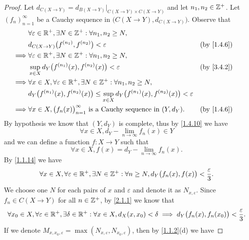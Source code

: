 \begin{proof}
  Let \(d_{C(X \to Y)} = d_{B(X \to Y)}|_{C(X \to Y) \times C(X \to Y)}\) and let \(n_1, n_2 \in \mathbb{Z}^+\).
  Let \((f_n)_{n = 1}^\infty\) be a Cauchy sequence in \(\big(C(X \to Y), d_{C(X \to Y)}\big)\).
  Observe that
  \begin{align*}
             & \forall \varepsilon \in \R^+, \exists N \in \Z^+ : \forall n_1, n_2 \geq N,                                                       \\
             & d_{C(X \to Y)}\big(f^{(n_1)}, f^{(n_2)}\big) < \varepsilon                                                        &  & \by{1.4.6} \\
    \implies & \forall \varepsilon \in \R^+, \exists N \in \Z^+ : \forall n_1, n_2 \geq N,                                                       \\
             & \sup_{x \in X} d_Y\big(f^{(n_1)}(x), f^{(n_2)}(x)\big) < \varepsilon                                              &  & \by{3.4.2} \\
    \implies & \forall x \in X, \forall \varepsilon \in \R^+, \exists N \in \Z^+ : \forall n_1, n_2 \geq N,                                      \\
             & d_Y\big(f^{(n_1)}(x), f^{(n_2)}(x)\big) \leq \sup_{x \in X} d_Y\big(f^{(n_1)}(x), f^{(n_2)}(x)\big) < \varepsilon                 \\
    \implies & \forall x \in X, \big(f_n(x)\big)_{n = 1}^\infty \text{ is a Cauchy sequence in } (Y, d_Y).                       &  & \by{1.4.6}
  \end{align*}
  By hypothesis we know that \((Y, d_Y)\) is complete, thus by \cref{1.4.10} we have
  \[
    \forall x \in X, d_Y - \lim_{n \to \infty} f_n(x) \in Y
  \]
  and we can define a function \(f : X \to Y\) such that
  \[
    \forall x \in X, f(x) = d_Y - \lim_{n \to \infty} f_n(x).
  \]
  By \cref{1.1.14} we have
  \[
    \forall x \in X, \forall \varepsilon \in \mathbb{R}^+, \exists N \in \mathbb{Z}^+ : \forall n \geq N, d_Y\big(f_n(x), f(x)\big) < \dfrac{\varepsilon}{3}.
  \]
  We choose one \(N\) for each pairs of \(x\) and \(\varepsilon\) and denote it as \(N_{x, \varepsilon}\).
  Since \(f_n \in C(X \to Y)\) for all \(n \in \mathbb{Z}^+\), by \cref{2.1.1} we know that
  \[
    \forall x_0 \in X, \forall \varepsilon \in \mathbb{R}^+, \exists \delta \in \mathbb{R}^+ : \forall x \in X, d_X(x, x_0) < \delta \implies d_Y\big(f_n(x), f_n(x_0)\big) < \dfrac{\varepsilon}{3}.
  \]
  If we denote \(M_{x, x_0, \varepsilon} = \max(N_{x, \varepsilon}, N_{x_0, \varepsilon})\), then by \cref{1.1.2}(d) we have

\end{proof}
